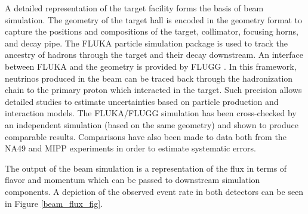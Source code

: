 A detailed representation of the \numi target facility forms the basis
of beam simulation.
The geometry of the target hall is encoded in the \geant geometry format
to capture the positions and compositions of the target, collimator,
focusing horns, and decay pipe.
The FLUKA \cite{fluka} particle simulation package is used to track the
ancestry of hadrons through the target and their decay downstream.
An interface between FLUKA and the \geant geometry is provided
by  FLUGG \cite{campanella1999first}.
In this framework, neutrinos produced in the beam can be traced back
through the hadronization chain to the primary proton which interacted in the
target.
Such precision allows detailed studies to estimate uncertainties based
on particle production and interaction models.
The FLUKA/FLUGG simulation has been cross-checked by an independent
\geant simulation (based on the same geometry) and shown to produce
comparable results.
Comparisons have also been made to data both from the NA49
\cite{gazdzicki2004report} and MIPP \cite{paley2014measurement}
experiments in order to estimate systematic errors.

The output of the beam simulation is a representation of the \numi flux
in terms of flavor and momentum which can be passed to downstream simulation
components.  A depiction of the observed event rate in both detectors can be
seen in Figure \ref{beam_flux_fig}.

